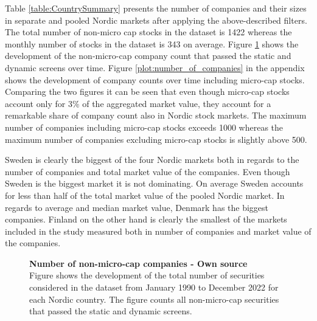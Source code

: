 \documentclass[12pt]{article}
\begin{document}
Table \ref{table:CountrySummary} presents the number of companies and their sizes in separate and pooled Nordic markets after applying the above-described filters. The total number of non-micro cap stocks in the dataset is 1422 whereas the monthly number of stocks in the dataset is 343 on average. Figure \ref{plot:number_of_companies_wo_micro} shows the development of the non-micro-cap company count that passed the static and dynamic screens over time. Figure \ref{plot:number_of_companies} in the appendix shows the development of company counts over time including micro-cap stocks. Comparing the two figures it can be seen that even though micro-cap stocks account only for 3\% of the aggregated market value, they account for a remarkable share of company count also in Nordic stock markets. The maximum number of companies including micro-cap stocks exceeds 1000 whereas the maximum number of companies excluding micro-cap stocks is slightly above 500. \par

Sweden is clearly the biggest of the four Nordic markets both in regards to the number of companies and total market value of the companies. Even though Sweden is the biggest market it is not dominating. On average Sweden accounts for less than half of the total market value of the pooled Nordic market. In regards to average and median market value, Denmark has the biggest companies. Finland on the other hand is clearly the smallest of the markets included in the study measured both in number of companies and market value of the companies. \par

\begin{figure}[ht]
\centering
\caption[Number of non-micro-cap companies]{\textbf{Number of non-micro-cap companies \textnormal{- Own source}}\\ Figure shows the development of the total number of securities considered in the dataset from January 1990 to December 2022 for each Nordic country. The figure counts all non-micro-cap securities that passed the static and dynamic screens.}

\label{plot:number_of_companies_wo_micro}
\end{figure}
\end{document}
